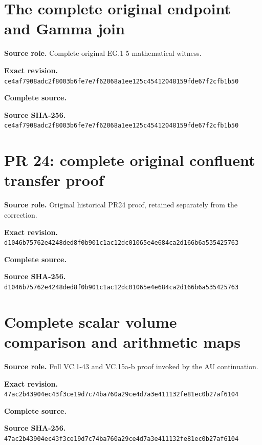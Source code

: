 \begingroup
\sloppy
\small
\clearpage
\section{The complete original endpoint and Gamma join}
\noindent\textbf{Source role.} Complete original EG.1-5 mathematical witness.\par
\noindent\textbf{Exact revision.} \nolinkurl{ce4af7908adc2f8003b6fe7e7f62068a1ee125c45412048159fde67f2cfb1b50}\par
\noindent\textbf{Complete source.} \par
\noindent\textbf{Source SHA-256.} \nolinkurl{ce4af7908adc2f8003b6fe7e7f62068a1ee125c45412048159fde67f2cfb1b50}\par\medskip

\endgroup

\begingroup
\sloppy
\small
\clearpage
\section{PR 24: complete original confluent transfer proof}
\noindent\textbf{Source role.} Original historical PR24 proof, retained separately from the correction.\par
\noindent\textbf{Exact revision.} \nolinkurl{d1046b75762e4248ded8f0b901c1ac12dc01065e4e684ca2d166b6a535425763}\par
\noindent\textbf{Complete source.} \par
\noindent\textbf{Source SHA-256.} \nolinkurl{d1046b75762e4248ded8f0b901c1ac12dc01065e4e684ca2d166b6a535425763}\par\medskip

\endgroup

\begingroup
\sloppy
\small
\let\split\aligned
\let\endsplit\endaligned
\clearpage
\section{Complete scalar volume comparison and arithmetic maps}
\noindent\textbf{Source role.} Full VC.1-43 and VC.15a-b proof invoked by the AU continuation.\par
\noindent\textbf{Exact revision.} \nolinkurl{47ac2b43904ec43f3ce19d7c74ba760a29ce4d7a3e411132fe81ec0b27af6104}\par
\noindent\textbf{Complete source.} \par
\noindent\textbf{Source SHA-256.} \nolinkurl{47ac2b43904ec43f3ce19d7c74ba760a29ce4d7a3e411132fe81ec0b27af6104}\par\medskip

\endgroup

